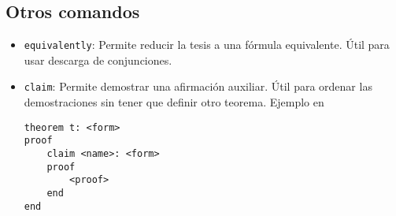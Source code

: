 \subsection{Otros comandos}

\begin{itemize}
    \item \lstinline{equivalently}: Permite reducir la tesis a una fórmula
    equivalente. Útil para usar descarga de conjunciones.
    
    

    \item \lstinline{claim}: Permite demostrar una afirmación auxiliar. Útil
    para ordenar las demostraciones sin tener que definir otro teorema. Ejemplo
    en 

    \begin{lstlisting}[numbers=none]
theorem t: <form>
proof
    claim <name>: <form>
    proof
        <proof>
    end
end
    \end{lstlisting}
\end{itemize}
